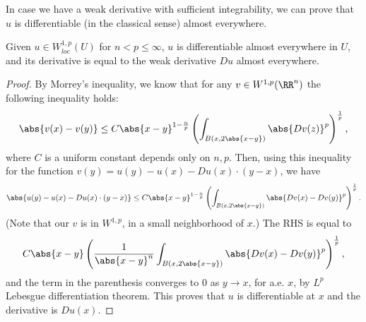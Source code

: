 \documentclass[a4paper]{amsart}
\begin{document}
In case we have a weak derivative with sufficient integrability, we can prove that \(u\) is differentiable (in the classical sense) almost everywhere. 
\begin{prop*}
    Given \(u\in W_{loc}^{1, p}(U)\) for \(n< p \le \infty\), \(u\) is differentiable almost everywhere in \(U\), and its derivative is equal to the weak derivative \(Du\) almost everywhere. 
\end{prop*}
\begin{proof}
    By Morrey's inequality, we know that for any \(v\in W^{1, p}(\RR^n)\) the following inequality holds: 
    \[
        \abs{v(x)-v(y)}\le C\abs{x-y}^{1-\frac{n}{p}}\left(\int_{B(x, 2\abs{x-y})}\abs{Dv(z)}^p\right)^{\frac{1}{p}},
    \]
    where \(C\) is a uniform constant depends only on \(n, p\).
    Then, using this inequality for the function \(v(y) = u(y) - u(x) - Du(x)\cdot (y-x)\), we have 
    \[
        \abs{u(y) - u(x) - Du(x)\cdot (y-x)}
        \le C\abs{x-y}^{1-\frac{n}{p}}\left(\int_{B(x, 2\abs{x-y})}\abs{Dv(x)-Dv(y)}^p\right)^{\frac{1}{p}}.
    \]
    (Note that our \(v\) is in \(W^{1, p}\), in a small neighborhood of \(x\).)
    The RHS is equal to 
    \[
        C\abs{x-y}\left(\frac{1}{\abs{x-y}^n}\int_{B(x, 2\abs{x-y})}\abs{Dv(x)-Dv(y)}^p\right)^{\frac{1}{p}},
    \]
    and the term in the parenthesis converges to \(0\) as \(y\to x\), for a.e. \(x\), by \(L^p\) Lebesgue differentiation theorem. 
    This proves that \(u\) is differentiable at \(x\) and the derivative is \(Du(x)\). 
\end{proof}
\end{document}
